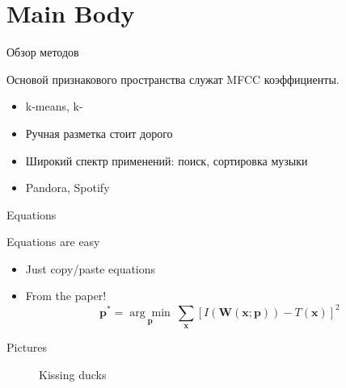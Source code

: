 \documentclass[xcolor=svgnames,handout]{beamer}
\begin{document}
\section
  {Main Body}
\begin{frame}
  {Обзор методов}

Основой признакового пространства служат MFCC коэффициенты.

\begin{itemize}
      \item k-means, k-
      \item Ручная разметка стоит дорого
      \item Широкий спектр применений: поиск, сортировка музыки
      \item Pandora, Spotify
  \end{itemize}
  
  
\end{frame}

\begin{frame}
  {Equations}

  Equations are easy
  \begin{itemize}
  \item Just copy/paste equations\pause
  \item From the paper!
    \begin{equation*}
      \textbf{p}^* = \underset{\textbf{p}}{\arg\!\min}~\sum_{\textbf{x}}\left[ I(\textbf{W}(\textbf{x};\textbf{p})) - T(\textbf{x}) \right]^2
    \end{equation*}
  \end{itemize}
\end{frame}


\begin{frame}
  {Pictures}

  \begin{figure}[t]
    \centering
    \caption{Kissing ducks}
  \end{figure}
\end{frame}
\end{document}
